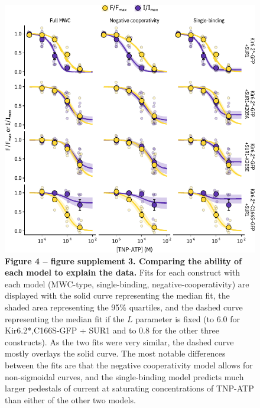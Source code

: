 \documentclass[10pt,lineno, doublespacing]{elife}
\begin{document}
\begin{figure}
\begin{fullwidth}
\centering
\includegraphics[height=0.75\textheight]{figure_four_s3}
\captionsetup{labelformat=empty}
\caption{
\textbf{Figure 4 -- figure supplement 3. Comparing the ability of each model to explain the data. }
Fits for each construct with each model (MWC-type, single-binding, negative-cooperativity) are displayed with the solid curve representing the median fit, the shaded area representing the 95\% quartiles, and the dashed curve representing the median fit if the $L$ parameter is fixed (to 6.0 for Kir6.2*,C166S-GFP + SUR1 and to 0.8 for the other three constructs).
As the two fits were very similar, the dashed curve mostly overlays the solid curve.
The most notable differences between the fits are that the negative cooperativity model allows for non-sigmoidal curves, and the single-binding model predicts much larger pedestals of current at saturating concentrations of TNP-ATP than either of the other two models.
}
\label{fig:four_s3}
\end{fullwidth}
\end{figure}
\end{document}
